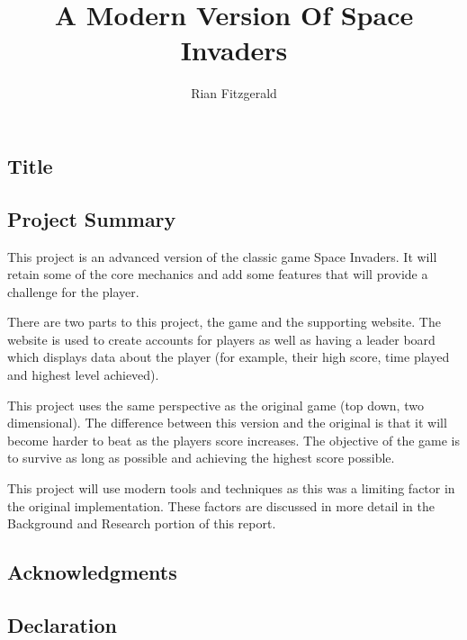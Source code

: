 \documentclass[12pt]{article}
\title{A Modern Version Of Space Invaders}
\author{Rian Fitzgerald}
\begin{document}
\newpage
\begin{center}
\section*{Title}
\end{center}
\newpage
\begin{center}
\section*{Project Summary}
\end{center}
This project is an advanced version of the classic game Space Invaders. It will retain some of the core mechanics and add some features that will provide a challenge for the player. 

There are two parts to this project, the game and the supporting website. The website is used to create accounts for players as well as having a leader board which displays data about the player (for example, their high score, time played and highest level achieved). 

This project uses the same perspective as the original game (top down, two dimensional). The difference between this version and the original is that it will become harder to beat as the players score increases. The objective of the game is to survive as long as possible and achieving the highest score possible. 

This project will use modern tools and techniques as this was a limiting factor in the original implementation. These factors are discussed in more detail in the Background and Research portion of this report. 

\newpage
\begin{center}
\section*{Acknowledgments}
\end{center}
\newpage
\begin{center}
\section*{Declaration}
\end{center}
\newpage

\begin{center}
\tableofcontents
\end{center}
\end{document}
